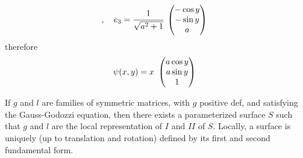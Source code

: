 \documentclass[10pt]{article}
\begin{document}
\begin{example}
\begin{equation*}
\begin{aligned}
\begin{array}{lc}
                        \end{array},\quad
                        e_3 = \cfrac{1}{\sqrt{a^2+1}}
                        \begin{array}{lc}
                            \setlength{\arraycolsep}{3pt}
                            \begingroup
                            \renewcommand*{\arraystretch}{1}
                            \begin{pmatrix}
                                -\cos y \\
                                -\sin y \\
                                a \\
                            \end{pmatrix}
                            \endgroup
                        \end{array}
                    \end{aligned}
                \end{equation*}
                therefore
                \begin{equation*}
                    \begin{aligned}
                        \psi(x,y) = x
                        \begin{array}{lc}
                            \setlength{\arraycolsep}{3pt}
                            \begingroup
                            \renewcommand*{\arraystretch}{1}
                            \begin{pmatrix}
                                a\cos y \\
                                a\sin y \\
                                1 \\
                            \end{pmatrix}
                            \endgroup
                        \end{array}
                    \end{aligned}
                \end{equation*}
            \end{example}

            \begin{theorem}
                If $g$ and $l$ are families of symmetric matrices, with $g$ positive def, and satisfying the Gauss-Godozzi equation, then there exists a parameterized surface $S$ such that $g$ and $l$ are the local representation of $I$ and $II$ of $S$. Locally, a surface is uniquely (up to translation and rotation) defined by its first and second fundamental form.
            \end{theorem}
            
\end{document}
